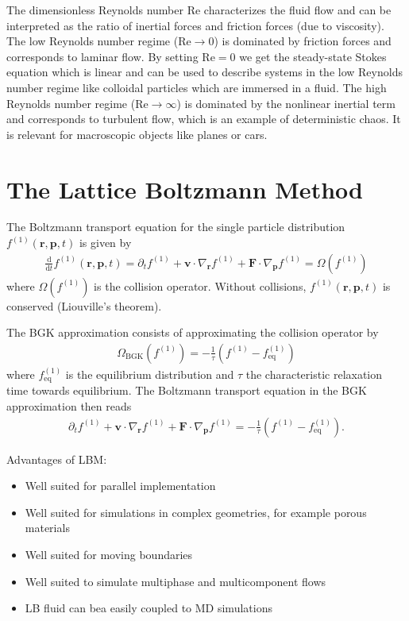 \documentclass[a4paper,10pt,bibtotoc]{scrartcl}
\begin{document}
The dimensionless Reynolds number Re characterizes the fluid flow and can be interpreted as the ratio of inertial forces and friction forces (due to viscosity). The low Reynolds number regime ($\mathrm{Re}\rightarrow 0$) is dominated by friction forces and corresponds to laminar flow. By setting $\mathrm{Re}= 0$ we get the steady-state Stokes equation which is linear and can be used to describe systems in the low Reynolds number regime like colloidal particles which are immersed in a fluid. The high Reynolds number regime ($\mathrm{Re}\rightarrow \infty$) is dominated by the nonlinear inertial term and corresponds to turbulent flow, which is an example of deterministic chaos. It is relevant for macroscopic objects like planes or cars.


\section{The Lattice Boltzmann Method}
The Boltzmann transport equation for the single particle distribution $f^{(1)}(\mathbf{r},\mathbf{p},t)$ is given by
\begin{align}
 \frac{\mathrm{d}}{\mathrm{d}t}f^{(1)}(\mathbf{r},\mathbf{p},t) = \partial_t f^{(1)} + \mathbf{v}\cdot\nabla_\mathbf{r}f^{(1)} + \mathbf{F}\cdot\nabla_\mathbf{p}f^{(1)} = \Omega (f^{(1)})
\end{align}
where $\Omega (f^{(1)})$ is the collision operator. Without collisions, $f^{(1)}(\mathbf{r},\mathbf{p},t)$ is conserved (Liouville's theorem).

The BGK approximation consists of approximating the collision operator by
\begin{align}
 \Omega_\mathrm{BGK} (f^{(1)}) = -\frac{1}{\tau}\left(f^{(1)} - f^{(1)}_\mathrm{eq}\right)
\end{align}
where $f^{(1)}_\mathrm{eq}$ is the equilibrium distribution and $\tau$ the characteristic relaxation time towards equilibrium. The Boltzmann transport equation in the BGK approximation then reads
\begin{align}
    \partial_t f^{(1)} + \mathbf{v}\cdot\nabla_\mathbf{r}f^{(1)} + \mathbf{F}\cdot\nabla_\mathbf{p}f^{(1)} =
  -\frac{1}{\tau}\left(f^{(1)} - f^{(1)}_\mathrm{eq}\right).
\end{align}


Advantages of LBM:
\begin{itemize}
 \item Well suited for parallel implementation
 \item Well suited for simulations in complex geometries, for example porous materials
 \item Well suited for moving boundaries
 \item Well suited to simulate multiphase and multicomponent flows
 \item LB fluid can bea easily coupled to MD simulations
\end{itemize}
\end{document}
